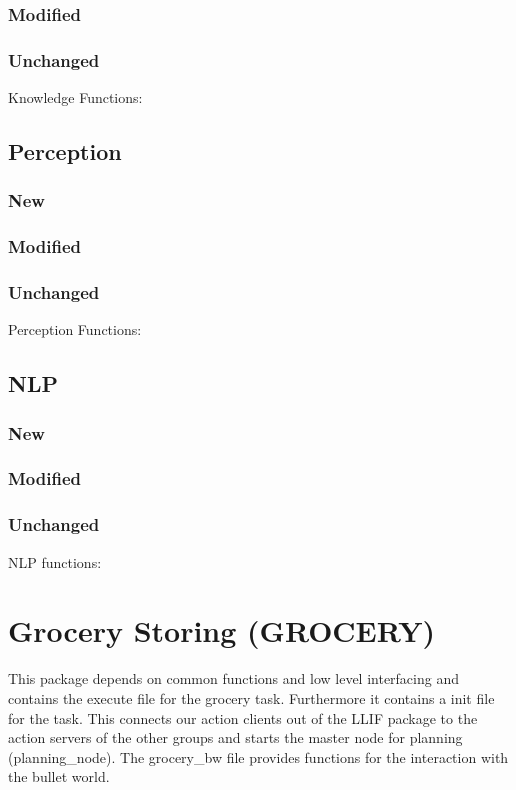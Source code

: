 \documentclass[main.tex]{subfiles}
\begin{document}
                \subsubsection{Modified}
                \subsubsection{Unchanged}Knowledge Functions:
                
                \subsection{Perception}
                \subsubsection{New}
                \subsubsection{Modified}
                \subsubsection{Unchanged}Perception Functions:
                
                \subsection{NLP}
                \subsubsection{New}
                \subsubsection{Modified}
                \subsubsection{Unchanged}NLP functions:
                
                \section{Grocery Storing (GROCERY)}
                This package depends on common functions and low level interfacing and contains the execute file for the grocery task. Furthermore it contains a init file for the task. This connects our action clients out of the LLIF package to the action servers of the other groups and starts the master node for planning (planning\_node). The grocery\_bw file provides functions for the interaction with the bullet world.   
\end{document}
